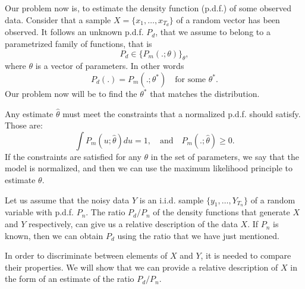 \label{Chapter:NCE}
Our problem now is, to estimate the density function (p.d.f.) of some observed data. Consider that a sample $X = \{x_1,\dots,x_{T_d}\}$ of a random vector has been observed. It follows an unknown p.d.f. $P_d$, that we assume to belong to a parametrized family of functions, that is
\[
P_d \in \{P_m(.;\theta)\}_\theta,
\]
where $\theta$ is a vector of parameters. In other words
$$
P_d(.) = P_m(.;\theta^*) \quad \text{for some } \theta^*.
$$
Our problem now will be to find the $\theta^*$ that matches the distribution. 

Any estimate $\hat{\theta}$ must meet the constraints that a normalized p.d.f. should satisfy. Those are:
$$
\int P_m(u;\hat{\theta})du = 1, \quad \text{and}\quad P_m(.;\hat{\theta})\geq 0.
$$
If the constraints are satisfied for any $\theta$ in the set of parameters, we say that the model is normalized, and then we can use the maximum likelihood principle to estimate $\theta$.

Let us assume that the noisy data $Y$ is an i.i.d. sample $\{y_1,\dots,Y_{T_n}\}$ of a random variable with p.d.f. $P_n$. The ratio $P_d/P_n$ of the density functions that generate $X$ and $Y$ respectively, can give us a relative description of the data $X$. If $P_n$ is known, then we can obtain $P_d$ using the ratio that we have just mentioned.

In order to discriminate between elements of $X$ and $Y$, it is needed to compare their properties. We will show that we can provide a relative description of $X$ in the form of an estimate of the ratio $P_d/P_n$.


